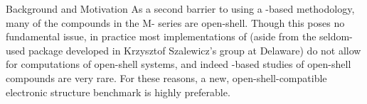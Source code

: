 \begin{section}{Background and Motivation}
As a second barrier to using a \sapt-based methodology, many of the compounds in the M- series are
open-shell. Though this poses no fundamental issue, 
in practice most implementations of \sapt (aside from the
seldom-used  package developed in Krzysztof Szalewicz's group at
Delaware) do not allow for computations of open-shell systems, and indeed
\sapt-based studies of open-shell compounds are very
rare.\cite{Zuchowski2008a} For these reasons, a new, open-shell-compatible electronic structure
benchmark is highly preferable.


\end{section}


